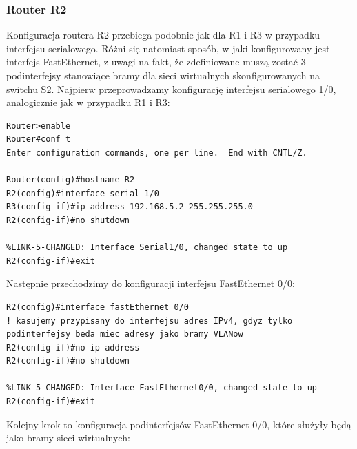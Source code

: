 \documentclass[polish,11pt,a4paper,twoside]{article}
\begin{document}
\subsubsection{Router R2}
Konfiguracja routera R2 przebiega podobnie jak dla R1 i R3 w przypadku interfejsu serialowego. Różni się natomiast sposób, w jaki konfigurowany jest interfejs FastEthernet, z uwagi na fakt, że zdefiniowane muszą zostać 3 podinterfejsy stanowiące bramy dla sieci wirtualnych skonfigurowanych na switchu S2.
Najpierw przeprowadzamy konfigurację interfejsu serialowego 1/0, analogicznie jak w przypadku R1 i R3:
\begin{lstlisting}
Router>enable
Router#conf t
Enter configuration commands, one per line.  End with CNTL/Z.

Router(config)#hostname R2
R2(config)#interface serial 1/0
R3(config-if)#ip address 192.168.5.2 255.255.255.0
R2(config-if)#no shutdown 

%LINK-5-CHANGED: Interface Serial1/0, changed state to up
R2(config-if)#exit
\end{lstlisting}
Następnie przechodzimy do konfiguracji interfejsu FastEthernet 0/0:
\begin{lstlisting}
R2(config)#interface fastEthernet 0/0
! kasujemy przypisany do interfejsu adres IPv4, gdyz tylko podinterfejsy beda miec adresy jako bramy VLANow
R2(config-if)#no ip address
R2(config-if)#no shutdown 

%LINK-5-CHANGED: Interface FastEthernet0/0, changed state to up
R2(config-if)#exit
\end{lstlisting}
Kolejny krok to konfiguracja podinterfejsów FastEthernet 0/0, które służyły będą jako bramy sieci wirtualnych:
\end{document}
